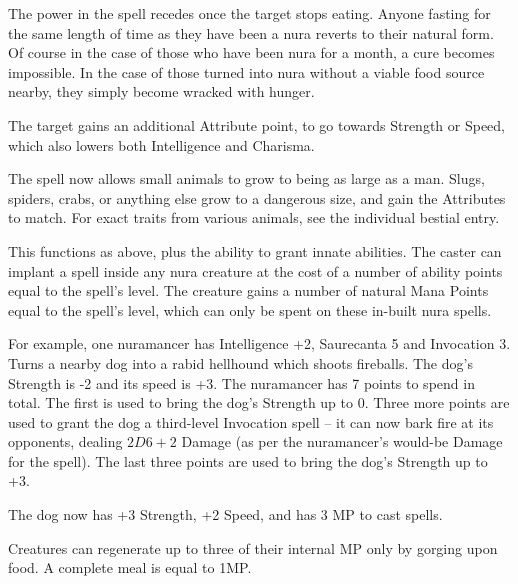 \begin{multicols}{2}
The power in the spell recedes once the target stops eating.
Anyone fasting for the same length of time as they have been a nura reverts to their natural form.
Of course in the case of those who have been nura for a month, a cure becomes impossible.
In the case of those turned into nura without a viable food source nearby, they simply become wracked with hunger.

The target gains an additional Attribute point, to go towards Strength or Speed, which also lowers both Intelligence and Charisma.


The spell now allows small animals to grow to being as large as a man.
Slugs, spiders, crabs, or anything else grow to a dangerous size, and gain the Attributes to match.
For exact traits from various animals, see the individual bestial entry.

\spelllevel
{}

This functions as above, plus the ability to grant innate abilities.  The caster can implant a spell inside any nura creature at the cost of a number of ability points equal to the spell's level.  The creature gains a number of natural Mana Points equal to the spell's level, which can only be spent on these in-built nura spells.

\begin{exampletext}

For example, one nuramancer has Intelligence +2, Saurecanta 5 and Invocation 3.
Turns a nearby dog into a rabid hellhound which shoots fireballs.
The dog's Strength is -2 and its speed is +3.
The nuramancer has 7 points to spend in total.
The first is used to bring the dog's Strength up to 0.
Three more points are used to grant the dog a third-level Invocation spell -- it can now bark fire at its opponents, dealing $2D6+2$ Damage (as per the nuramancer's would-be Damage for the spell).
The last three points are used to bring the dog's Strength up to +3.

The dog now has +3 Strength, +2 Speed, and has 3 MP to cast spells.

\end{exampletext}

Creatures can regenerate up to three of their internal MP only by gorging upon food.  A complete meal is equal to 1MP.

\end{multicols}

